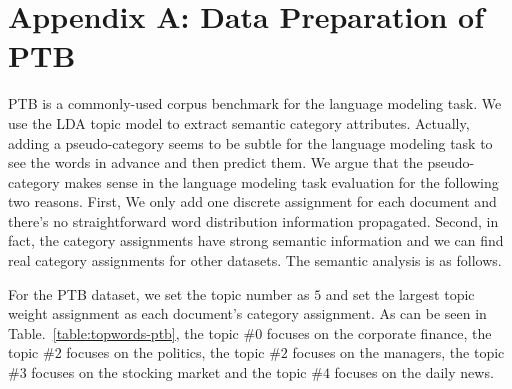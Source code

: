 \documentclass[a4paper]{article}
\begin{document}
\section*{Appendix A: Data Preparation of PTB}
PTB is a commonly-used corpus benchmark for the language modeling task. We use the LDA topic model to extract semantic category attributes.
Actually, adding a pseudo-category seems to be subtle for the language modeling task to see the words in advance and then predict them. We argue that the pseudo-category makes sense in the language modeling task evaluation for the following two reasons. First, We only add one discrete assignment for each document and there's no straightforward word distribution information propagated. Second, in fact, the category assignments have strong semantic information and we can find real category assignments for other datasets. The semantic analysis is as follows.

For the PTB dataset, we set the topic number as $5$ and set the largest topic weight assignment as each document's category assignment. As can be seen in Table.~\ref{table:topwords-ptb}, the topic $\#0$ focuses on the corporate finance, the topic $\#2$ focuses on the politics, the topic $\#2$ focuses on the managers, the topic $\#3$ focuses on the stocking market and the topic $\#4$ focuses on the daily news.
\end{document}
